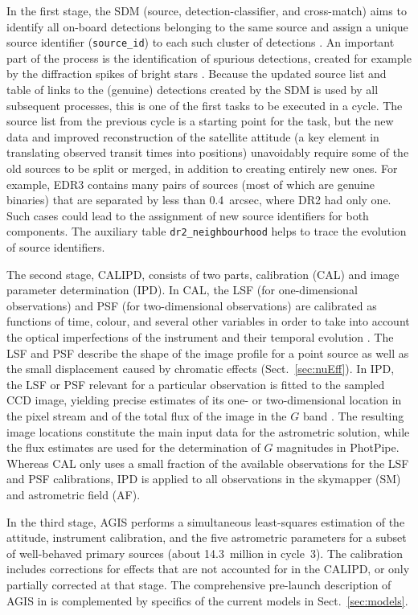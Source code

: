 \documentclass[longauth]{aa} %
\newcommand{\gacs}[1]{{\footnotesize\texttt{#1}}}
\begin{document}
In the first stage, the SDM (source, detection-classifier, and cross-match) aims to identify all on-board
detections belonging to the same source and assign a unique source identifier (\gacs{source\_id}) 
to each such cluster of detections \citep{EDR3-DPACP-124}. An important part of the process is the 
identification of spurious detections, created for example by the diffraction spikes of bright stars 
. 
Because the updated source list and table of links to the (genuine) detections created by the 
SDM is used by all subsequent processes, this is one of the first tasks to be executed in a cycle.
The source list from the previous cycle is a starting point for the task, but the new data and 
improved reconstruction of the satellite attitude (a key element in translating observed 
transit times into positions) unavoidably require some of the old sources to be split or merged,
in addition to creating entirely new ones. For example, EDR3 contains many pairs of sources 
(most of which are genuine binaries) that are separated by less than 0.4~arcsec, where DR2 had only one. 
Such cases could lead to the assignment of new source identifiers for both components.
The auxiliary table \gacs{dr2\_neighbourhood} helps to trace the evolution of source identifiers.

The second stage, CALIPD, consists of two parts, calibration (CAL) and image parameter 
determination (IPD). In CAL, the LSF (for one-dimensional observations) and PSF 
(for two-dimensional observations) are calibrated as functions of time, colour, 
and several other variables in order to take into account the optical imperfections of the 
instrument and their temporal evolution \citep{EDR3-DPACP-73}. The LSF and PSF 
describe the shape of the image profile for a point source as well as the small 
displacement caused by chromatic effects (Sect.~\ref{sec:nuEff}).
In IPD, the LSF or PSF relevant for a particular observation is fitted to the sampled CCD image, 
yielding precise estimates of its one- or two-dimensional location in the pixel stream 
and of the total flux of the image in the $G$ band . 
The resulting image locations constitute the main input data for the astrometric solution,
while the flux estimates are used for the determination of $G$ magnitudes in PhotPipe.
Whereas CAL only uses a small fraction of the available observations for the LSF and PSF
calibrations, IPD is applied to all observations in the skymapper (SM) and
astrometric field (AF).
 
In the third stage, AGIS performs a simultaneous least-squares
estimation of the attitude, instrument calibration, and the five astrometric parameters for
a subset of well-behaved primary sources (about 14.3~million in cycle~3). The calibration
includes corrections for effects that are not accounted for in the CALIPD, or only partially
corrected at that stage. The comprehensive pre-launch description of AGIS in 
 is complemented by specifics of the
current models in Sect.~\ref{sec:models}.
\end{document}
